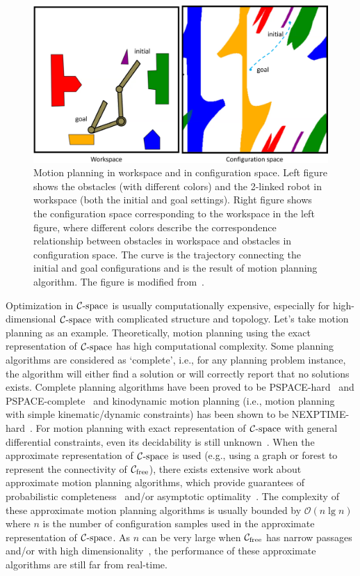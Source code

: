 \begin{figure}[htb]
  \centering
  \includegraphics[width=\linewidth]{figs/1/planning-crop.pdf}
  \caption[Motion planning in workspace and in configuration space]{Motion planning in workspace and in configuration space. Left figure shows the obstacles (with different colors) and the 2-linked robot in workspace (both the initial and goal settings). Right figure shows the configuration space corresponding to the workspace in the left figure, where different colors describe the correspondence relationship between obstacles in workspace and obstacles in configuration space. The curve is the trajectory connecting the initial and goal configurations and is the result of motion planning algorithm. The figure is modified from~\cite{cspaceJapplet}. \label{fig:1:planning}}
\end{figure}


Optimization in $\mathcal C\text{-space}$ is usually computationally expensive, especially for high-dimensional $\mathcal C\text{-space}$ with complicated structure and topology. Let's take motion planning as an example. Theoretically, motion planning using the exact representation of $\mathcal C\text{-space}$ has high computational complexity. Some planning algorithms are considered as `complete', i.e., for any planning problem instance, the algorithm will either find a solution or will correctly report that no solutions exists. Complete planning algorithms have been proved to be PSPACE-hard~\cite{Reif:1979:CMP} and PSPACE-complete~\cite{Canny:1988:AGC} and kinodynamic motion planning (i.e., motion planning with simple kinematic/dynamic constraints) has been shown to be NEXPTIME-hard~\cite{Canny:1988:CKP}. For motion planning with exact representation of $\mathcal C\text{-space}$ with general differential constraints, even its decidability is still unknown~\cite{Cheng:2007:DMP}. When the approximate representation of $\mathcal C\text{-space}$ is used (e.g., using a graph or forest to represent the connectivity of $\mathcal C_{\text{free}}$), there exists extensive work about approximate motion planning algorithms, which provide guarantees of probabilistic completeness~\cite{Kavraki96,Kuffner00} and/or asymptotic optimality~\cite{Sertac:IJRR:2011}. The complexity of these approximate motion planning algorithms is usually bounded by $\mathcal O(n\lg n)$ where $n$ is the number of configuration samples used in the approximate representation of $\mathcal C\text{-space}$. As $n$ can be very large when $\mathcal C_{\text{free}}$ has narrow passages and/or with high dimensionality~\cite{Hsu:2006:ijrr}, the performance of these approximate algorithms are still far from real-time.


